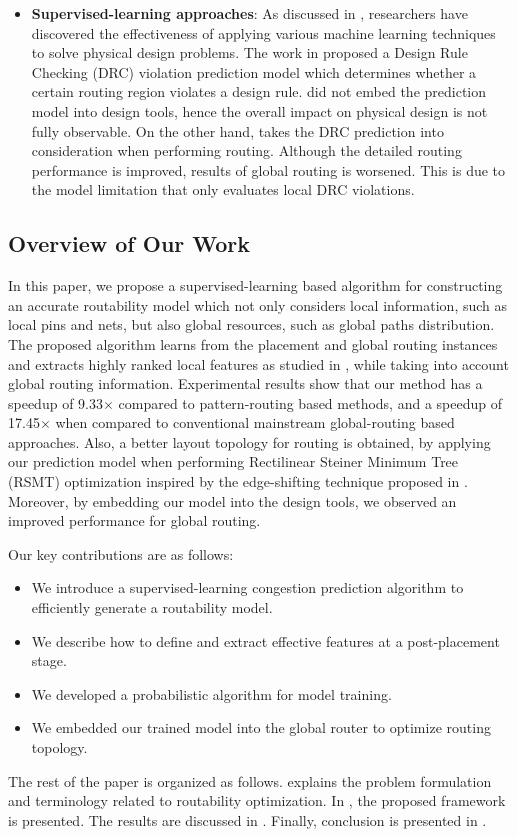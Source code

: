 \begin{itemize}
\item \textbf{Supervised-learning approaches}: As discussed in \cite{mlinphysicaldesign}, researchers have discovered the effectiveness of applying various machine learning techniques to solve physical design problems. The work in \cite{drcpredict18} proposed a Design Rule Checking (DRC) violation prediction model which determines whether a certain routing region  violates a design rule.   \cite{drcpredict18,drcDAT18} did not embed the prediction model into design tools, hence the overall impact on physical design is not fully observable. On the other hand, \cite{drcingr} takes the DRC prediction into consideration when performing routing. Although the detailed routing performance is improved, results of global routing is worsened. This is due to the model limitation that only evaluates local DRC violations.
\end{itemize}


\subsection{Overview of Our Work}
In this paper, we propose a supervised-learning based algorithm for constructing an accurate routability model which not only considers local information, such as local pins and nets, but also global resources, such as global paths distribution.
The proposed algorithm learns from the placement and global routing instances and extracts highly ranked local features as studied in \cite{parameterstudy}, while taking into account global routing information.
Experimental results show that our method has a speedup of 9.33$\times$ compared to pattern-routing based methods, and a speedup of 17.45$\times$ when compared to conventional mainstream global-routing based approaches. Also, a better layout topology for routing is obtained, by applying our prediction model when performing Rectilinear Steiner Minimum Tree (RSMT) optimization inspired by the edge-shifting technique proposed in \cite{fastroute}.
Moreover, by embedding our model into the design tools, we observed an improved performance for global routing.


Our key contributions are as follows:
\begin{itemize}
\item We introduce a supervised-learning congestion prediction algorithm to efficiently generate a routability model.
\item We describe how to define and extract effective features at a post-placement stage.
\item We developed a probabilistic algorithm for model training.
\item We embedded our trained model into the global router to optimize routing topology.
\end{itemize}

The rest of the paper is organized as follows.
 explains the problem formulation and terminology related to routability optimization.
In , the proposed framework is presented.
The results are discussed in . Finally, conclusion is presented in .
